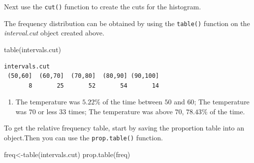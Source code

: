 \documentclass[
  letterpaper,
  DIV=11,
  numbers=noendperiod]{scrreprt}
\newenvironment{Shaded}{\begin{snugshade}}{\end{snugshade}}
\newcommand{\AttributeTok}[1]{\textcolor[rgb]{0.40,0.45,0.13}{#1}}
\newcommand{\ConstantTok}[1]{\textcolor[rgb]{0.56,0.35,0.01}{#1}}
\newcommand{\FunctionTok}[1]{\textcolor[rgb]{0.28,0.35,0.67}{#1}}
\newcommand{\NormalTok}[1]{\textcolor[rgb]{0.00,0.23,0.31}{#1}}
\newcommand{\OtherTok}[1]{\textcolor[rgb]{0.00,0.23,0.31}{#1}}
\newcommand{\SpecialCharTok}[1]{\textcolor[rgb]{0.37,0.37,0.37}{#1}}
\providecommand{\tightlist}{%
  \setlength{\itemsep}{0pt}\setlength{\parskip}{0pt}}\usepackage{longtable,booktabs,array}
\begin{document}
Next use the \texttt{cut()} function to create the cuts for the
histogram.

\begin{Shaded}
\end{Shaded}

The frequency distribution can be obtained by using the \texttt{table()}
function on the \emph{interval.cut} object created above.

\begin{Shaded}
\begin{Highlighting}[numbers=left,,]
\FunctionTok{table}\NormalTok{(intervals.cut)}
\end{Highlighting}
\end{Shaded}

\begin{verbatim}
intervals.cut
 (50,60]  (60,70]  (70,80]  (80,90] (90,100] 
       8       25       52       54       14 
\end{verbatim}

\begin{blackbox}

\begin{enumerate}
\def\labelenumi{\arabic{enumi}.}
\setcounter{enumi}{1}
\tightlist
\item
  The temperature was \(5.22\)\% of the time between \(50\) and \(60\);
  The temperature was \(70\) or less \(33\) times; The temperature was
  above \(70\), \(78.43\)\% of the time.
\end{enumerate}

\end{blackbox}

To get the relative frequency table, start by saving the proportion
table into an object.Then you can use the \texttt{prop.table()}
function.

\begin{Shaded}
\begin{Highlighting}[numbers=left,,]
\NormalTok{freq}\OtherTok{\textless{}{-}}\FunctionTok{table}\NormalTok{(intervals.cut) }
\FunctionTok{prop.table}\NormalTok{(freq)}
\end{Highlighting}
\end{Shaded}
\end{document}
